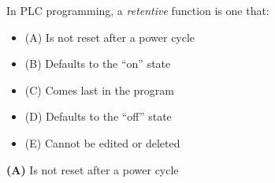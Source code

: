 

In PLC programming, a {\it retentive} function is one that:

\begin{itemize}
\item{(A)} Is not reset after a power cycle
\vskip 5pt 
\item{(B)} Defaults to the ``on'' state
\vskip 5pt 
\item{(C)} Comes last in the program
\vskip 5pt 
\item{(D)} Defaults to the ``off'' state
\vskip 5pt 
\item{(E)} Cannot be edited or deleted
\end{itemize}







{\bf (A)} Is not reset after a power cycle
 










